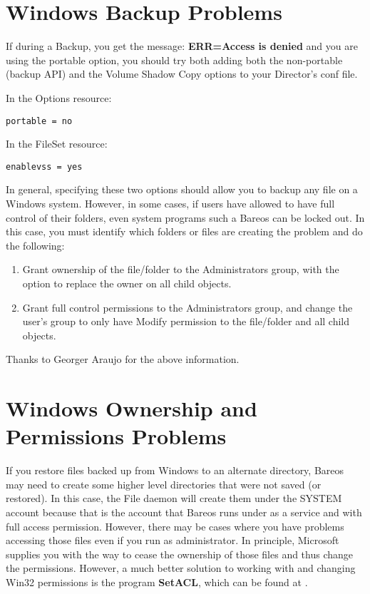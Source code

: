 \section{Windows Backup Problems}
If during a Backup, you get the message:
{\bf ERR=Access is denied} and you are using the portable option,
you should try both adding both the non-portable (backup API) and
the Volume Shadow Copy options to your Director's conf file.

In the Options resource:
\footnotesize
\begin{verbatim}
portable = no
\end{verbatim}
\normalsize

In the FileSet resource:
\footnotesize
\begin{verbatim}
enablevss = yes
\end{verbatim}
\normalsize

In general, specifying these two options should allow you to backup
any file on a Windows system.  However, in some cases, if users
have allowed to have full control of their folders, even system programs
such a Bareos can be locked out.  In this case, you must identify
which folders or files are creating the problem and do the following:

\begin{enumerate}
\item Grant ownership of the file/folder to the Administrators group,
with the option to replace the owner on all child objects.
\item Grant full control permissions to the Administrators group,
and change the user's group to only have Modify permission to
the file/folder and all child objects.
\end{enumerate}

Thanks to Georger Araujo for the above information.

\section{Windows Ownership and Permissions Problems}

If you restore files backed up from Windows to an alternate directory,
Bareos may need to create some higher level directories that were not saved
(or restored). In this case, the File daemon will create them under the SYSTEM
account because that is the account that Bareos runs under as a service and with full access permission.
However, there may be cases where you have problems accessing those files even
if you run as administrator. In principle, Microsoft supplies you with the way
to cease the ownership of those files and thus change the permissions.
However, a much better solution to working with and changing Win32 permissions
is the program {\bf SetACL}, which can be found at
.

